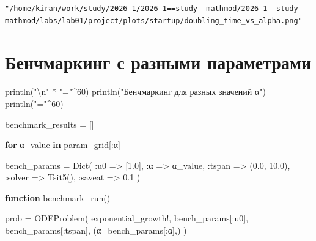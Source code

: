 \documentclass[
  russian,
  12pt,
  a4paper,
  DIV=11,
  numbers=noendperiod]{scrreprt}
\newenvironment{Shaded}{\begin{snugshade}}{\end{snugshade}}
\newcommand{\ControlFlowTok}[1]{\textcolor[rgb]{0.00,0.23,0.31}{\textbf{#1}}}
\newcommand{\FloatTok}[1]{\textcolor[rgb]{0.68,0.00,0.00}{#1}}
\newcommand{\FunctionTok}[1]{\textcolor[rgb]{0.28,0.35,0.67}{#1}}
\newcommand{\KeywordTok}[1]{\textcolor[rgb]{0.00,0.23,0.31}{\textbf{#1}}}
\newcommand{\NormalTok}[1]{\textcolor[rgb]{0.00,0.23,0.31}{#1}}
\newcommand{\OperatorTok}[1]{\textcolor[rgb]{0.37,0.37,0.37}{#1}}
\newcommand{\SpecialCharTok}[1]{\textcolor[rgb]{0.37,0.37,0.37}{#1}}
\newcommand{\StringTok}[1]{\textcolor[rgb]{0.13,0.47,0.30}{#1}}
\begin{document}
\begin{verbatim}
"/home/kiran/work/study/2026-1/2026-1==study--mathmod/2026-1--study--mathmod/labs/lab01/project/plots/startup/doubling_time_vs_alpha.png"
\end{verbatim}

\section{Бенчмаркинг с разными
параметрами}\label{ux431ux435ux43dux447ux43cux430ux440ux43aux438ux43dux433-ux441-ux440ux430ux437ux43dux44bux43cux438-ux43fux430ux440ux430ux43cux435ux442ux440ux430ux43cux438}

\begin{Shaded}
\begin{Highlighting}[]
\FunctionTok{println}\NormalTok{(}\StringTok{"}\SpecialCharTok{\textbackslash{}n}\StringTok{"} \OperatorTok{*} \StringTok{"="}\OperatorTok{\^{}}\FloatTok{60}\NormalTok{)}
\FunctionTok{println}\NormalTok{(}\StringTok{"Бенчмаркинг для разных значений α"}\NormalTok{)}
\FunctionTok{println}\NormalTok{(}\StringTok{"="}\OperatorTok{\^{}}\FloatTok{60}\NormalTok{)}

\NormalTok{benchmark\_results }\OperatorTok{=}\NormalTok{ []}

\ControlFlowTok{for}\NormalTok{ α\_value }\KeywordTok{in}\NormalTok{ param\_grid[}\OperatorTok{:}\NormalTok{α]}

\NormalTok{    bench\_params }\OperatorTok{=} \FunctionTok{Dict}\NormalTok{(}
        \OperatorTok{:}\NormalTok{u0 }\OperatorTok{=\textgreater{}}\NormalTok{ [}\FloatTok{1.0}\NormalTok{],}
        \OperatorTok{:}\NormalTok{α }\OperatorTok{=\textgreater{}}\NormalTok{ α\_value,}
        \OperatorTok{:}\NormalTok{tspan }\OperatorTok{=\textgreater{}}\NormalTok{ (}\FloatTok{0.0}\NormalTok{, }\FloatTok{10.0}\NormalTok{),}
        \OperatorTok{:}\NormalTok{solver }\OperatorTok{=\textgreater{}} \FunctionTok{Tsit5}\NormalTok{(),}
        \OperatorTok{:}\NormalTok{saveat }\OperatorTok{=\textgreater{}} \FloatTok{0.1}
\NormalTok{    )}

    \KeywordTok{function} \FunctionTok{benchmark\_run}\NormalTok{()}

\NormalTok{        prob }\OperatorTok{=} \FunctionTok{ODEProblem}\NormalTok{(}
\NormalTok{            exponential\_growth!,}
\NormalTok{            bench\_params[}\OperatorTok{:}\NormalTok{u0],}
\NormalTok{            bench\_params[}\OperatorTok{:}\NormalTok{tspan],}
\NormalTok{            (α}\OperatorTok{=}\NormalTok{bench\_params[}\OperatorTok{:}\NormalTok{α],)}
\NormalTok{        )}


\end{Highlighting}
\end{Shaded}
\end{document}
